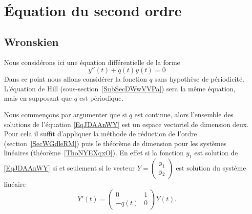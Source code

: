\section{Équation du second ordre}

\subsection{Wronskien}

Nous considérons ici une équation différentielle de la forme
\begin{equation}    \label{EqJDAAnWY}
	y''(t)+q(t)y(t)=0
\end{equation}
Dans ce point nous allons considérer la fonction \( q\) sans hypothèse de périodicité. L'équation de Hill (sous-section~\ref{SubSecDWwVVPa}) sera la même équation, mais en supposant que \( q\) est périodique.

Nous commençons par argumenter que si \( q\) est continue, alors l'ensemble des solutions de l'équation \eqref{EqJDAAnWY} est un espace vectoriel de dimension deux. Pour cela il suffit d'appliquer la méthode de réduction de l'ordre (section~\ref{SecWGdleRM}) puis le théorème de dimension pour les systèmes linéaires (théorème~\ref{ThoNYEXqxO}). En effet si la fonction \( y_1\) est solution de \eqref{EqJDAAnWY} si et seulement si le vecteur \(Y= \begin{pmatrix}
	y_1 \\
	y_2
\end{pmatrix}\) est solution du système linéaire
\begin{equation}
	Y'(t)=\begin{pmatrix}
		0     & 1 \\
		-q(t) & 0
	\end{pmatrix}Y(t).
\end{equation}

